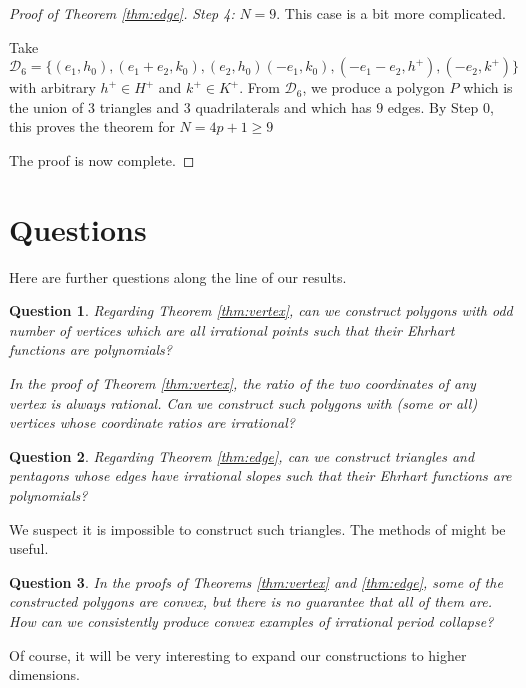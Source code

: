 \documentclass[a4paper]{article}
\newtheorem{que}{Question}
\begin{document}
\begin{proof}[Proof of Theorem \ref{thm:edge}]
    \textit{Step 4:} $N=9$. This case is a bit more complicated.
    
     Take $\mathcal{D}_6 = \{(e_1,h_0), (e_1+e_2,k_0), (e_2,h_0) (-e_1,k_0), (-e_1-e_2,h^+), (-e_2,k^+)\}$ with arbitrary $h^+ \in H^+$ and $k^+ \in K^+$. From $\mathcal{D}_6$, we produce a polygon $P$ which is the union of $3$ triangles and $3$ quadrilaterals and which has $9$ edges. By Step 0, this proves the theorem for $N = 4p+1 \geq 9$
     
     The proof is now complete.
    
\end{proof}

\section{Questions}

Here are further questions along the line of our results.

\begin{que}
	Regarding Theorem \ref{thm:vertex}, can we construct polygons with odd number of vertices which are all irrational points such that their Ehrhart functions are polynomials?
    
    In the proof of Theorem \ref{thm:vertex}, the ratio of the two coordinates of any vertex is always rational. Can we construct such polygons with (some or all) vertices whose coordinate ratios are irrational?
\end{que}

\begin{que}
	Regarding Theorem \ref{thm:edge}, can we construct triangles and pentagons whose edges have irrational slopes such that their Ehrhart functions are polynomials?    
\end{que}
    We suspect it is impossible to construct such triangles. The methods of \cite{} might be useful.

\begin{que}
	In the proofs of Theorems \ref{thm:vertex} and \ref{thm:edge}, some of the constructed polygons are convex, but there is no guarantee that all of them are. How can we consistently produce convex examples of irrational period collapse?
\end{que}


Of course, it will be very interesting to expand our constructions to higher dimensions.




\end{document}
